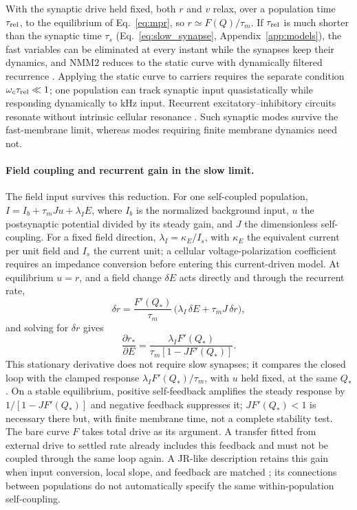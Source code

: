 With the synaptic drive held fixed, both $r$ and $v$ relax, over a population time
$\tau_{\rm rel}$, to the equilibrium of Eq.~\eqref{eq:mpr}, so $r\simeq F(Q)/\tau_m$.
If $\tau_{\rm rel}$ is much shorter than the synaptic time $\tau_s$
(Eq.~\eqref{eq:slow_synapse}, Appendix~\ref{app:models}), the fast variables can be
eliminated at every instant while the synapses keep their dynamics, and NMM2 reduces to
the static curve with dynamically filtered recurrence
\cite{ruffini2021nmm2,clusella2023}. Applying the static curve to carriers requires the separate condition
$\omega_c\tau_{\rm rel}\ll1$; one population can track synaptic input quasistatically
while responding dynamically to kHz input.
Recurrent excitatory--inhibitory circuits resonate without intrinsic
cellular resonance \cite{brunelhakim1999,brunelwang2003}. Such synaptic
modes survive the fast-membrane limit, whereas modes requiring finite
membrane dynamics need not.

\paragraph{Field coupling and recurrent gain in the slow limit.}
The field input survives this reduction. For one self-coupled population,
$I=I_b+\tau_mJu+\lambda_I E$, where $I_b$ is the normalized background input, $u$ the
postsynaptic potential divided by its steady gain, and $J$ the dimensionless
self-coupling. For a fixed field direction, $\lambda_I=\kappa_E/I_s$, with $\kappa_E$
the equivalent current per unit field and $I_s$ the current unit; a cellular
voltage-polarization coefficient requires an impedance conversion before entering this
current-driven model. At equilibrium $u=r$, and a field change $\delta E$ acts directly and through the
recurrent rate,
\begin{equation}
\delta r=\frac{F'(Q_*)}{\tau_m}\,\big(\lambda_I\,\delta E+\tau_mJ\,\delta r\big),
\end{equation}
and solving for $\delta r$ gives
\begin{equation}
\frac{\partial r_*}{\partial E}
=\frac{\lambda_I F'(Q_*)}{\tau_m[1-JF'(Q_*)]}.
\label{eq:slow-field-gain}
\end{equation}
This stationary derivative does not require slow synapses; it compares the closed loop
with the clamped response $\lambda_IF'(Q_*)/\tau_m$, with $u$ held fixed, at the same
$Q_*$. On a stable equilibrium, positive self-feedback amplifies the steady response by
$1/[1-JF'(Q_*)]$ and negative feedback suppresses it; $JF'(Q_*)<1$ is necessary there but,
with finite membrane time, not a complete stability test. The bare curve $F$ takes total drive as its
argument. A transfer fitted from external drive to settled rate already includes this
feedback and must not be coupled through the same loop again. A JR-like
description retains this gain when input conversion, local slope, and feedback are
matched \cite{ruffini2021nmm2,clusella2023}; its connections between populations do not
automatically specify the same within-population self-coupling.

